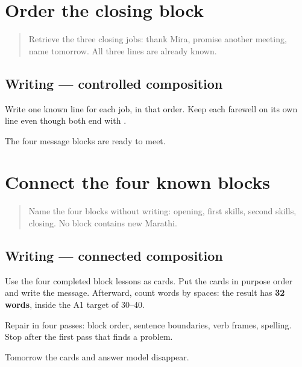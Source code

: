 \section[closing block]{Order the closing block}

\label{lesson:MR-A1M16-closing-block}



\begin{quote}
Retrieve the three closing jobs: thank Mira, promise another meeting, name tomorrow. All three lines are already known.
\end{quote}

\subsection*{Writing — controlled composition}
Write one known line for each job, in that order. Keep each farewell on its own line even though both end with \textbf{}.

\begin{tcolorbox}[breakable,colback=teal!4,colframe=teal!35!black,title={Before you move on}]
The four message blocks are ready to meet.
\end{tcolorbox}
\section[guided 32-word message]{Connect the four known blocks}

\label{lesson:MR-A1M17-guided-message}



\begin{quote}
Name the four blocks without writing: opening, first skills, second skills, closing. No block contains new Marathi.
\end{quote}

\subsection*{Writing — connected composition}
Use the four completed block lessons as cards. Put the cards in purpose order and write the message. Afterward, count words by spaces: the result has \textbf{32 words}, inside the A1 target of 30–40.

Repair in four passes: block order, sentence boundaries, verb frames, spelling. Stop after the first pass that finds a problem.

\begin{tcolorbox}[breakable,colback=teal!4,colframe=teal!35!black,title={Before you move on}]
Tomorrow the cards and answer model disappear.
\end{tcolorbox}
